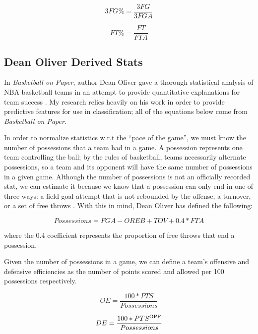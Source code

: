 \documentclass[]{article}
\def\SP#1{\textsuperscript{{#1}}}
\begin{document}
\begin{equation}
	3FG\% = \frac{3FG}{3FGA}
\end{equation}

\begin{equation}
	FT\% = \frac{FT}{FTA}
\end{equation}


\subsection{Dean Oliver Derived Stats}

In \textit{Basketball on Paper}, author Dean Oliver gave a thorough statistical analysis of NBA basketball teams in an attempt to provide quantitative explanations for team success \cite{basketballonpaper}. My research relies heavily on his work in order to provide predictive features for use in classification; all of the equations below come from \textit{Basketball on Paper}.

In order to normalize statistics w.r.t the ``pace of the game'', we must know the number of possessions that a team had in a game. A possession represents one team controlling the ball; by the rules of basketball, teams necessarily alternate possessions, so a team and its opponent will have the same number of possessions in a given game. Although the number of possessions is not an officially recorded stat, we can estimate it because we know that a possession can only end in one of three ways: a field goal attempt that is not rebounded by the offense, a turnover, or a set of free throws \cite{basketballonpaper}. With this in mind, Dean Oliver has defined the following:

\begin{equation}
	Possessions = FGA - OREB + TOV + 0.4*FTA
\end{equation}

where the 0.4 coefficient represents the proportion of free throws that end a possession.

Given the number of possessions in a game, we can define a team's offensive and defensive efficiencies as the number of points scored and allowed per 100 possessions respectively.

\begin{equation}
	OE = \frac{100*PTS}{Possessions}
\end{equation}

\begin{equation}
	DE = \frac{100*PTS\SP{OPP}}{Possessions}
\end{equation}
\end{document}

